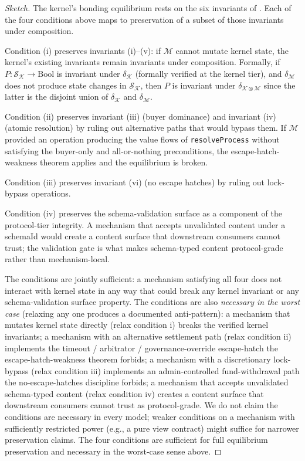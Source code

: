 \documentclass[11pt,a4paper]{article}
\theoremstyle{definition}
\theoremstyle{remark}
\begin{document}
\begin{proof}[Sketch]
The kernel's bonding equilibrium rests on the six invariants of
. Each of the four conditions above maps to
preservation of a subset of those invariants under composition.

Condition (i) preserves invariants (i)--(v): if
$\mathcal{M}$ cannot mutate kernel state, the kernel's existing
invariants remain invariants under composition. Formally, if
$P : \mathcal{S}_{\mathcal{K}} \to \mathrm{Bool}$ is invariant under
$\delta_{\mathcal{K}}$ (formally verified at the kernel tier), and
$\delta_{\mathcal{M}}$ does not produce state changes in
$\mathcal{S}_{\mathcal{K}}$, then $P$ is invariant under
$\delta_{\mathcal{K} \otimes \mathcal{M}}$ since the latter is the
disjoint union of $\delta_{\mathcal{K}}$ and $\delta_{\mathcal{M}}$.

Condition (ii) preserves invariant (iii) (buyer dominance) and
invariant (iv) (atomic resolution) by ruling out alternative paths
that would bypass them. If $\mathcal{M}$ provided an operation
producing the value flows of \texttt{resolveProcess} without
satisfying the buyer-only and all-or-nothing preconditions, the
escape-hatch-weakness theorem applies and the equilibrium is broken.

Condition (iii) preserves invariant (vi) (no escape hatches) by
ruling out lock-bypass operations.

Condition (iv) preserves the schema-validation surface as a
component of the protocol-tier integrity. A mechanism that accepts
unvalidated content under a schemaId would create a content surface
that downstream consumers cannot trust; the validation gate is
what makes schema-typed content protocol-grade rather than
mechanism-local.

The conditions are jointly sufficient: a mechanism satisfying all
four does not interact with kernel state in any way that could
break any kernel invariant or any schema-validation surface
property. The conditions are also \emph{necessary in the worst
case} (relaxing any one produces a documented anti-pattern): a
mechanism that mutates kernel state directly (relax condition i)
breaks the verified kernel invariants; a mechanism with an
alternative settlement path (relax condition ii) implements the
timeout / arbitrator / governance-override escape-hatch the
escape-hatch-weakness theorem forbids; a mechanism with a
discretionary lock-bypass (relax condition iii) implements an
admin-controlled fund-withdrawal path the no-escape-hatches
discipline forbids; a mechanism that accepts unvalidated schema-typed
content (relax condition iv) creates a content surface that
downstream consumers cannot trust as protocol-grade. We do not claim the conditions are necessary in
every model; weaker conditions on a mechanism with sufficiently
restricted power (e.g., a pure view contract) might suffice for
narrower preservation claims. The four conditions are sufficient
for full equilibrium preservation and necessary in the
worst-case sense above.
\end{proof}
\end{document}
